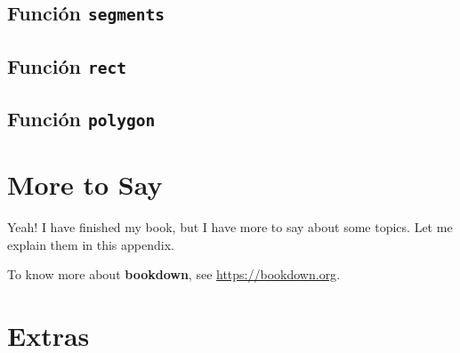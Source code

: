 \documentclass[10pt,]{krantz}
\begin{document}
\section{\texorpdfstring{Función \texttt{segments} 
}{Función segments  }}\label{funcion-segments}

\section{\texorpdfstring{Función \texttt{rect} 
}{Función rect  }}\label{funcion-rect}

\section{\texorpdfstring{Función \texttt{polygon} 
}{Función polygon  }}\label{funcion-polygon}

\cleardoublepage 

\appendix {}


\chapter{More to Say}\label{more-to-say}

Yeah! I have finished my book, but I have more to say about some topics.
Let me explain them in this appendix.

To know more about \textbf{bookdown}, see \url{https://bookdown.org}.

\chapter{Extras}\label{extras}
\end{document}
